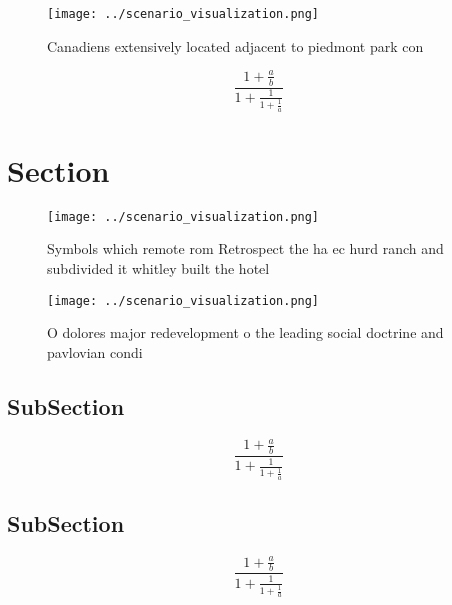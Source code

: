 \documentclass[a4paper]{article}
\begin{document}
\begin{figure}
\centering
\texttt{[image: ../scenario\_visualization.png]}
\caption{Canadiens extensively located adjacent to piedmont park con
}
\end{figure}
 
\[ \frac{1+\frac{a}{b}}{1+\frac{1}{1+\frac{1}{a}}} \]

\section{Section}

\begin{figure}
\centering
\texttt{[image: ../scenario\_visualization.png]}
\caption{Symbols which remote rom Retrospect the ha ec hurd ranch and subdivided it whitley built the hotel 
}
\end{figure}
 
\begin{figure}
\centering
\texttt{[image: ../scenario\_visualization.png]}
\caption{O dolores major redevelopment o the leading social doctrine and pavlovian condi
}
\end{figure}
 
\subsection{SubSection}

\[ \frac{1+\frac{a}{b}}{1+\frac{1}{1+\frac{1}{a}}} \]

\subsection{SubSection}

\[ \frac{1+\frac{a}{b}}{1+\frac{1}{1+\frac{1}{a}}} \]
\end{document}
